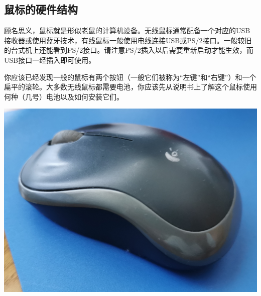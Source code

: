 \subsection{鼠标的硬件结构}
顾名思义，鼠标就是形似老鼠的计算机设备。无线鼠标通常配备一个对应的USB接收器或使用蓝牙技术，有线鼠标一般使用电线连接USB或PS/2接口。一般较旧的台式机上还能看到PS/2接口。请注意PS/2插入以后需要重新启动才能生效，而USB接口一经插入即可使用。\par
你应该已经发现一般的鼠标有两个按钮（一般它们被称为“左键”和“右键”）和一个扁平的滚轮。大多数无线鼠标都需要电池，你应该先从说明书上了解这个鼠标使用何种（几号）电池以及如何安装它们。
\begin{center}
	\includegraphics[width=0.7\linewidth]{pic/Mouse}
\end{center}\par
